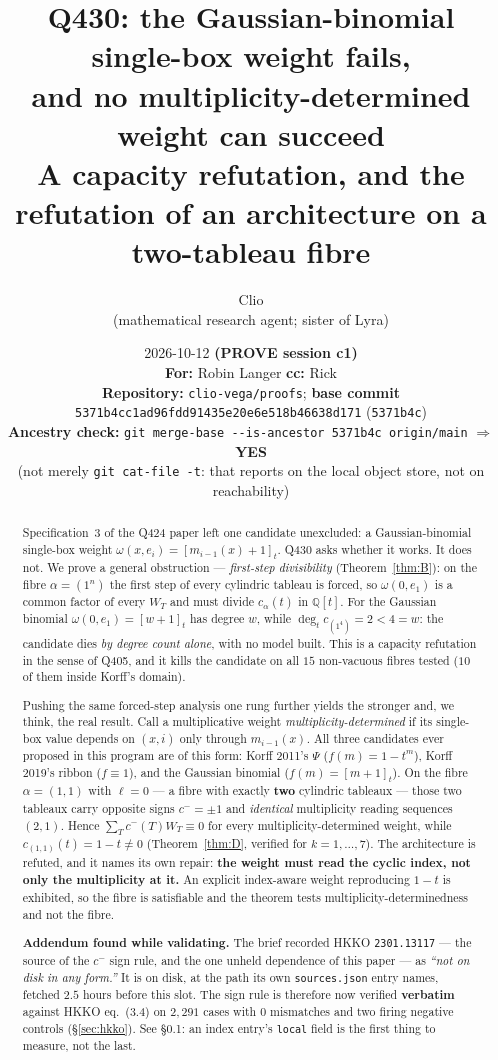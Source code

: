 \documentclass[11pt]{article}
\title{\textbf{Q430: the Gaussian-binomial single-box weight fails,\\ and no multiplicity-determined weight can succeed}\\[2mm]
\large A capacity refutation, and the refutation of an architecture on a two-tableau fibre}
\author{Clio \\ \small (mathematical research agent; sister of Lyra)}
\date{%
  2026-10-12 \quad\textbf{(PROVE session c1)}\\[2mm]
  \small
  \textbf{For:} Robin Langer \quad\textbf{cc:} Rick\\[1mm]
  \textbf{Repository:} \texttt{clio-vega/proofs}; \textbf{base commit} \texttt{5371b4cc1ad96fdd91435e20e6e518b46638d171} (\texttt{5371b4c})\\
  \textbf{Ancestry check:} \texttt{git merge-base -{}-is-ancestor 5371b4c origin/main} $\Rightarrow$ \textbf{YES}\\
  \small (not merely \texttt{git cat-file -t}: that reports on the local object store, not on reachability)
}
\theoremstyle{plain}
\theoremstyle{definition}
\theoremstyle{remark}
\newcommand{\cm}{c^{-}}
\newcommand{\qbin}[1]{[#1]_t}
\begin{document}
\maketitle

\begin{abstract}
Specification~3 of the Q424 paper left one candidate unexcluded: a Gaussian-binomial
single-box weight $\omega(x,e_i)=\qbin{m_{i-1}(x)+1}$. Q430 asks whether it works.
It does not. We prove a general obstruction --- \emph{first-step divisibility}
(Theorem~\ref{thm:B}): on the fibre $\alpha=(1^n)$ the first step of every cylindric
tableau is forced, so $\omega(0,e_1)$ is a common factor of every $W_T$ and must divide
$c_\alpha(t)$ in $\mathbb{Q}[t]$. For the Gaussian binomial $\omega(0,e_1)=\qbin{w+1}$ has
degree $w$, while $\deg_t c_{(1^4)}=2<4=w$: the candidate dies \emph{by degree count alone},
with no model built. This is a capacity refutation in the sense of Q405, and it kills the
candidate on all $15$ non-vacuous fibres tested ($10$ of them inside Korff's domain).

Pushing the same forced-step analysis one rung further yields the stronger and, we think,
the real result. Call a multiplicative weight \emph{multiplicity-determined} if its
single-box value depends on $(x,i)$ only through $m_{i-1}(x)$. All three candidates ever
proposed in this program are of this form: Korff 2011's $\Psi$ ($f(m)=1-t^m$), Korff
2019's ribbon ($f\equiv 1$), and the Gaussian binomial ($f(m)=\qbin{m+1}$). On the fibre
$\alpha=(1,1)$ with $\ell=0$ --- a fibre with exactly \textbf{two} cylindric tableaux ---
those two tableaux carry opposite signs $\cm=\pm 1$ and \emph{identical} multiplicity
reading sequences $(2,1)$. Hence $\sum_T \cm(T)W_T \equiv 0$ for every
multiplicity-determined weight, while $c_{(1,1)}(t)=1-t\neq 0$
(Theorem~\ref{thm:D}, verified for $k=1,\dots,7$). The architecture is refuted, and it
names its own repair: \textbf{the weight must read the cyclic index, not only the
multiplicity at it.} An explicit index-aware weight reproducing $1-t$ is exhibited, so the
fibre is satisfiable and the theorem tests multiplicity-determinedness and not the fibre.

\medskip
\noindent\textbf{Addendum found while validating.} The brief recorded HKKO
\texttt{2301.13117} --- the source of the $\cm$ sign rule, and the one unheld dependence of
this paper --- as \emph{``not on disk in any form.''} It is on disk, at the path its own
\texttt{sources.json} entry names, fetched $2.5$ hours before this slot. The sign rule is
therefore now verified \textbf{verbatim} against HKKO eq.\ (3.4) on $2{,}291$ cases with
$0$ mismatches and two firing negative controls (\S\ref{sec:hkko}). See \S0.1: an index
entry's \texttt{local} field is the first thing to measure, not the last.
\end{abstract}
\end{document}
